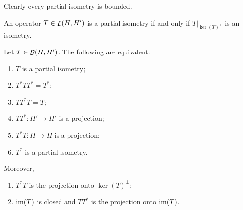 Clearly every partial isometry is bounded.

\begin{lemma}
An operator $T\in \mathop{\mathcal{L}}(H, H')$ is a partial isometry \textup{if and only if} $T|_{\ker(T)^\perp}$ is an isometry.
\end{lemma}

\begin{proposition}
Let $T\in \mathop{\mathcal{B}}(H,H')$. The following are equivalent:
\begin{enumerate}
\item $T$ is a partial isometry;
\item $T^*TT^* = T^*$;
\item $TT^*T = T$;
\item $TT^*: H' \to H'$ is a projection;
\item $T^*T: H \to H$ is a projection;
\item $T^*$ is a partial isometry.
\end{enumerate}
Moreover,
\begin{enumerate}
\item $T^*T$ is the projection onto $\ker(T)^\perp$;
\item $\operatorname{im}(T)$ is closed and $TT^*$ is the projection onto $\operatorname{im}(T)$.
\end{enumerate}
\end{proposition}
